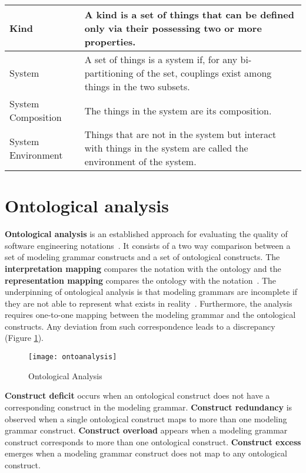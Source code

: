 \documentclass[parskip=full]{uvamscse}
\begin{document}
\begin{center}
\begin{longtable}{ | p{11em} | p{30em} | }
 \hline
 Kind & A kind is a set of things that can be defined only via their possessing two or more properties. \\ 
\hline
 System & A set of things is a system if, for any bi-partitioning of the set, couplings exist among things in the two subsets. \\
 \hline
 System Composition & The things in the system are its composition. \\
 \hline
 System Environment &  Things that are not in the system but interact with things in the system are called the environment of the system. \\
 \hline
\end{longtable}
\end{center}


\section{Ontological analysis}

\textbf{Ontological analysis} is an established approach for evaluating the quality of software engineering notations~\cite{moody2009physics}. It consists of a two way comparison between a set of modeling grammar constructs and a set of ontological constructs. The \textbf{interpretation mapping} compares the notation with the ontology and the \textbf{representation mapping} compares the ontology with the notation~\cite{gehlert2007toward}. The underpinning of ontological analysis is that modeling grammars are incomplete if they are not able to represent what exists in reality~\cite{green2000integrated}. Furthermore, the analysis requires one-to-one mapping between the modeling grammar and the ontological constructs. Any deviation from such correspondence leads to a discrepancy (Figure \ref{fig:ontoanalysis}).

\begin{figure}[h!]
  \centering
  \caption{Ontological Analysis~\cite{gehlert2007toward}}
  \label{fig:ontoanalysis}
  \texttt{[image: ontoanalysis]}
\end{figure}

\textbf{Construct deficit} occurs when an ontological construct does not have a corresponding construct in the modeling grammar. \textbf{Construct redundancy} is observed when a single ontological construct maps to more than one modeling grammar construct. \textbf{Construct overload} appears when a modeling grammar construct corresponds to more than one ontological construct. \textbf{Construct excess} emerges when a modeling grammar construct does not map to any ontological construct.~\cite{moody2009physics}
\end{document}
